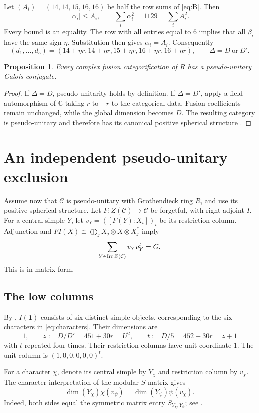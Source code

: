 \documentclass[11pt]{article}
\newtheorem{proposition}[theorem]{Proposition}
\theoremstyle{remark}\newtheorem{remark}[theorem]{Remark}
\newcommand{\C}{\mathbb C}\newcommand{\Q}{\mathbb Q}\newcommand{\Z}{\mathbb Z}\newcommand{\F}{\mathbb F}
\newcommand{\one}{\mathbf1}\newcommand{\jv}{\boldsymbol{j}}\newcommand{\dd}{\boldsymbol{\delta}}
\begin{document}
Let $(A_i)=(14,14,15,16,16)$ be half the row sums of \eqref{eq:B}. Then
\[
|\alpha_i|\le A_i,\qquad\sum_i\alpha_i^2=1129=\sum_iA_i^2.
\]
Every bound is an equality. The row with all entries equal to $6$ implies that all $\beta_i$ have the same sign $\eta$. Substitution then gives $\alpha_i=A_i$. Consequently
\[
(d_1,\ldots,d_5)=(14+\eta r,14+\eta r,15+\eta r,16+\eta r,16+\eta r),
\qquad \Delta=D\ \text{or}\ D'.
\]

\begin{proposition}\label{prop:PUreduction}
Every complex fusion categorification of $R$ has a pseudo-unitary Galois conjugate.
\end{proposition}
\begin{proof}
If $\Delta=D$, pseudo-unitarity holds by definition. If $\Delta=D'$, apply a field automorphism of $\C$ taking $r$ to $-r$ to the categorical data. Fusion coefficients remain unchanged, while the global dimension becomes $D$. The resulting category is pseudo-unitary and therefore has its canonical positive spherical structure \cite[Proposition 8.23]{ENO}.
\end{proof}

\section{An independent pseudo-unitary exclusion}
Assume now that $\mathcal C$ is pseudo-unitary with Grothendieck ring $R$, and use its positive spherical structure. Let $F:Z(\mathcal C)\to\mathcal C$ be forgetful, with right adjoint $I$. For a central simple $Y$, let $v_Y=([F(Y):X_i])_i$ be its restriction column. Adjunction and $FI(X)\cong\bigoplus_jX_j\otimes X\otimes X_j^*$ imply
\begin{equation}\label{eq:Gram}
\sum_{Y\in\operatorname{Irr} Z(\mathcal C)}v_Yv_Y^t=G.
\end{equation}
This is \cite[Proposition 2.4]{O} in matrix form.

\subsection{The low columns}
By \cite[Theorem 2.13]{O}, $I(\one)$ consists of six distinct simple objects, corresponding to the six characters in \eqref{eq:characters}. Their dimensions are
\[
1,\qquad z:=D/D'=451+30r=U^2,\qquad t:=D/5=452+30r=z+1
\]
with $t$ repeated four times. Their restriction columns have unit coordinate $1$. The unit column is $(1,0,0,0,0,0)^t$.

For a character $\chi$, denote its central simple by $Y_\chi$ and restriction column by $v_\chi$. The character interpretation of the modular $S$-matrix gives
\begin{equation}\label{eq:reciprocity}
\dim(Y_\chi)\chi(v_\psi)=\dim(Y_\psi)\psi(v_\chi).
\end{equation}
Indeed, both sides equal the symmetric matrix entry $S_{Y_\chi,Y_\psi}$; see \cite[Example 2.9 and Theorem 2.13]{O}.
\end{document}
